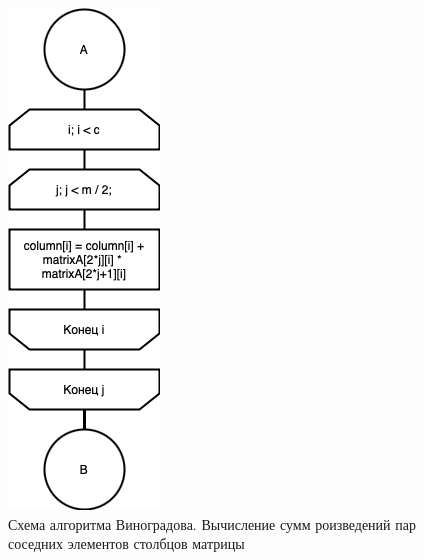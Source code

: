 \begin{figure}[h]
    \centering
    \includegraphics[width=0.3\linewidth]{img/WinogradPrB.jpg}
    \caption{Схема алгоритма Виноградова. Вычисление сумм роизведений 
    пар соседних элементов столбцов матрицы}
    \label{fig:mpr}
\end{figure}

